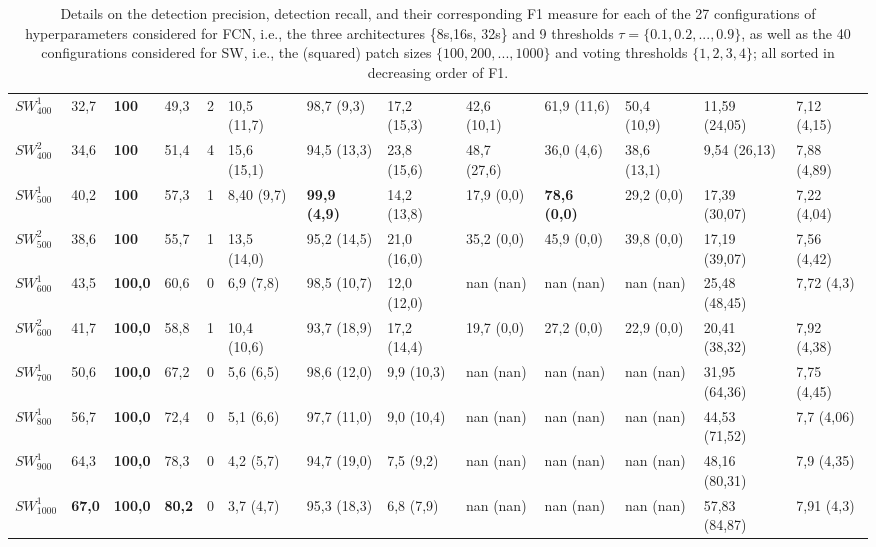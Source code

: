 \documentclass[a4paper,authoryear,review]{elsarticle}
\begin{document}
\begin{table}[]
\begin{adjustbox}{angle=90}
\begin{tabular}{lllllllllllll}
			$SW_{400}^{1}$ & 32,7 & \cellcolor[HTML]{E0C2CD}\textbf{100} & 49,3 & 2 & 10,5 (11,7) & 98,7 (9,3) & 17,2 (15,3) & 42,6 (10,1) & 61,9 (11,6) & 50,4 (10,9) & 11,59 (24,05) & 7,12 (4,15) \\
			$SW_{400}^{2}$ & 34,6 & \cellcolor[HTML]{E0C2CD}\textbf{100} & 51,4 & 4 & 15,6 (15,1) & 94,5 (13,3) & 23,8 (15,6) & 48,7 (27,6) & 36,0 (4,6) & 38,6 (13,1) & 9,54 (26,13) & 7,88 (4,89) \\
			$SW_{500}^{1}$ & 40,2 & \cellcolor[HTML]{E0C2CD}\textbf{100} & 57,3 & 1 & 8,40 (9,7) & \cellcolor[HTML]{E0C2CD}\textbf{99,9 (4,9)} & 14,2 (13,8) & 17,9 (0,0) & \cellcolor[HTML]{E0C2CD}\textbf{78,6 (0,0)} & 29,2 (0,0) & 17,39 (30,07) & 7,22 (4,04) \\
			$SW_{500}^{2}$ & 38,6 & \cellcolor[HTML]{E0C2CD}\textbf{100} & 55,7 & 1 & 13,5 (14,0) & 95,2 (14,5) & 21,0 (16,0) & 35,2 (0,0) & 45,9 (0,0) & 39,8 (0,0) & 17,19 (39,07) & 7,56 (4,42) \\
			$SW_{600}^{1}$ & 43,5 & \cellcolor[HTML]{E0C2CD}\textbf{100,0} & 60,6 & 0 & 6,9 (7,8) & 98,5 (10,7) & 12,0 (12,0) & nan (nan) & nan (nan) & nan (nan) & 25,48 (48,45) & 7,72 (4,3) \\
			$SW_{600}^{2}$ & 41,7 & \cellcolor[HTML]{E0C2CD}\textbf{100,0} & 58,8 & 1 & 10,4 (10,6) & 93,7 (18,9) & 17,2 (14,4) & 19,7 (0,0) & 27,2 (0,0) & 22,9 (0,0) & 20,41 (38,32) & 7,92 (4,38) \\
			$SW_{700}^{1}$ & 50,6 & \cellcolor[HTML]{E0C2CD}\textbf{100,0} & 67,2 & 0 & 5,6 (6,5) & 98,6 (12,0) & 9,9 (10,3) & nan (nan) & nan (nan) & nan (nan) & 31,95 (64,36) & 7,75 (4,45) \\
			$SW_{800}^{1}$ & 56,7 & \cellcolor[HTML]{E0C2CD}\textbf{100,0} & 72,4 & 0 & 5,1 (6,6) & 97,7 (11,0) & 9,0 (10,4) & nan (nan) & nan (nan) & nan (nan) & 44,53 (71,52) & 7,7 (4,06) \\
			$SW_{900}^{1}$ & 64,3 & \cellcolor[HTML]{E0C2CD}\textbf{100,0} & 78,3 & 0 & 4,2 (5,7) & 94,7 (19,0) & 7,5 (9,2) & nan (nan) & nan (nan) & nan (nan) & 48,16 (80,31) & 7,9 (4,35) \\
			$SW_{1000}^{1}$ & \cellcolor[HTML]{E0C2CD}\textbf{67,0} & \cellcolor[HTML]{E0C2CD}\textbf{100,0} & \cellcolor[HTML]{E0C2CD}\textbf{80,2} & 0 & 3,7 (4,7) & 95,3 (18,3) & 6,8 (7,9) & nan (nan) & nan (nan) & nan (nan) & 57,83 (84,87) & 7,91 (4,3) \\ \hline
		\end{tabular}
	\end{adjustbox}
	\caption{Details on the detection precision,  detection recall, and their corresponding  F1  measure for each of the 27 configurations of hyperparameters considered for FCN, i.e., the three architectures \{8s,16s, 32s\} and 9 thresholds $\tau=\{0.1,0.2,...,0.9\}$, as well as the 40 configurations considered for SW, i.e., the (squared) patch sizes  $\{100,200,...,1000\}$ and voting thresholds $\{1,2,3,4\}$; all sorted in decreasing order of F1.}

	\label{tab:TableXX}
\end{table}
\end{document}
